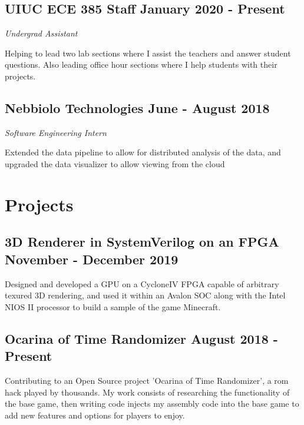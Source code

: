 \documentclass[letterpaper,11pt]{article}
\begin{document}
    \subsection{UIUC ECE 385 Staff \null\hfill January 2020 - Present}
    \vspace*{-2mm}
    \emph{Undergrad Assistant} \null\hfill \emph{}
    \vspace*{1mm}

    Helping to lead two lab sections where I assist the teachers and answer student questions. Also leading office hour sections where I help students with their projects.
    \vspace*{-2mm}
    \subsection{Nebbiolo Technologies \null\hfill June - August 2018}
    \vspace*{-2mm}
    \emph{Software Engineering Intern} \null\hfill \emph{}
    \vspace*{1mm}

    Extended the data pipeline to allow for distributed analysis of the data, and upgraded the data visualizer to allow viewing from the cloud
    \vspace*{-2mm}
\section{Projects}
    \subsection{3D Renderer in SystemVerilog on an FPGA \null\hfill November - December 2019}
    \vspace*{-2mm}
    Designed and developed a GPU on a CycloneIV FPGA capable of arbitrary texured 3D rendering, and used it within an Avalon SOC along with the Intel NIOS II processor to build a sample of the game Minecraft.
    \vspace*{-2mm}
    \subsection{Ocarina of Time Randomizer \null\hfill August 2018 - Present}
    \vspace*{-2mm}
    Contributing to an Open Source project 'Ocarina of Time Randomizer', a rom hack played by thousands. My work consists of researching the functionality of the base game, then writing code injects my assembly code into the base game to add new features and options for players to enjoy.
    \vspace*{-2mm}
\end{document}
